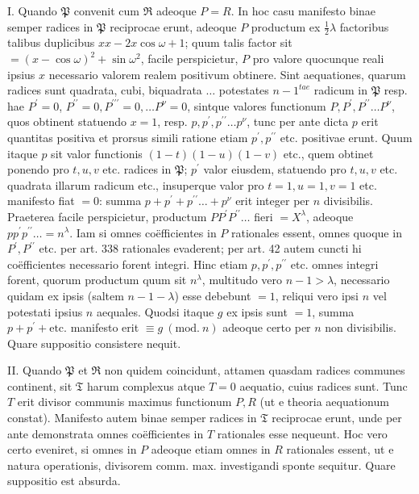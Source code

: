 I. Quando \(\mathfrak P\) convenit cum \(\mathfrak R\) adeoque \(P=R\). In hoc casu manifesto binae semper radices in \(\mathfrak P\) reciprocae erunt, adeoque \(P\) productum ex \(\frac12\lambda\) factoribus talibus duplicibus \(xx-2x\cos\omega+1\); quum talis factor sit \(=(x-\cos\omega)^2+\sin\omega^2\), facile perspicietur, \(P\) pro valore quocunque reali ipsius \(x\) necessario valorem realem positivum obtinere. Sint aequationes, quarum radices sunt quadrata, cubi, biquadrata \(\ldots\) potestates \(n-1^{tae}\) radicum in \(\mathfrak P\) resp. hae \(P^{\prime}=0\), \(P^{\prime\prime}=0,\allowbreak P^{\prime\prime\prime}=0,\allowbreak \ldots P^\nu=0\), sintque valores functionum \(P,\allowbreak P^{\prime},\allowbreak P^{\prime\prime}\ldots P^\nu\), quos obtinent statuendo \(x=1\), resp. \(p,\allowbreak p^{\prime},\allowbreak p^{\prime\prime}\ldots p^\nu\), tunc per ante dicta \(p\) erit quantitas positiva et prorsus simili ratione etiam \(p^{\prime},\allowbreak p^{\prime\prime}\) etc. positivae erunt. Quum itaque \(p\) sit valor functionis \((1-t)(1-u)(1-v)\) etc., quem obtinet ponendo pro \(t,\allowbreak u,\allowbreak v\) etc. radices in \(\mathfrak P\); \(p^{\prime}\) valor eiusdem, statuendo pro \(t,\allowbreak u,\allowbreak v\) etc. quadrata illarum radicum etc., insuperque valor pro \(t=1,\allowbreak u=1,\allowbreak v=1\) etc. manifesto fiat \(=0\): summa \(p+p^{\prime}+p^{\prime\prime}\ldots+p^\nu\) erit integer per \(n\) divisibilis. Praeterea facile perspicietur, productum \(PP^{\prime} P^{\prime\prime}\ldots\) fieri \(=X^\lambda\), adeoque \(pp^{\prime} p^{\prime\prime}\ldots=n^\lambda\). Iam si omnes coëfficientes in \(P\) rationales essent, omnes quoque in \(P^{\prime},\allowbreak P^{\prime\prime}\) etc. per art. 338 rationales evaderent; per art. 42 autem cuncti hi coëfficientes necessario forent integri. Hinc etiam \(p,\allowbreak p^{\prime},\allowbreak p^{\prime\prime}\) etc. omnes integri forent, quorum productum quum sit \(n^\lambda\), multitudo vero \(n-1>\lambda\), necessario quidam ex ipsis (saltem \(n-1-\lambda\)) esse debebunt \(=1\), reliqui vero ipsi \(n\) vel potestati ipsius \(n\) aequales. Quodsi itaque \(g\) ex ipsis sunt \(=1\), summa \(p+p^{\prime}+\mathrm{etc.}\) manifesto erit \(\equiv g\ (\mathrm{mod.}\ n)\) adeoque certo per \(n\) non divisibilis. Quare suppositio consistere nequit.

II. Quando \(\mathfrak P\) et \(\mathfrak R\) non quidem coincidunt, attamen quasdam radices communes continent, sit \(\mathfrak T\) harum complexus atque \(T=0\) aequatio, cuius radices sunt. Tunc \(T\) erit divisor communis maximus functionum \(P,\allowbreak R\) (ut e theoria aequationum constat). Manifesto autem binae semper radices in \(\mathfrak T\) reciprocae erunt, unde per ante demonstrata omnes coëfficientes in \(T\) rationales esse nequeunt. Hoc vero certo eveniret, si omnes in \(P\) adeoque etiam omnes in \(R\) rationales essent, ut e natura operationis, divisorem comm. max. investigandi sponte sequitur. Quare suppositio est absurda.

